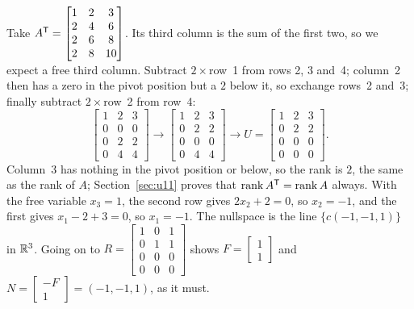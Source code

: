 \begin{example}\label{ex:u08-transpose}
Take $A^{\mathsf{T}}=\begin{bmatrix}1&2&3\\2&4&6\\2&6&8\\2&8&10\end{bmatrix}$. Its third column is the
sum of the first two, so we expect a free third column. Subtract $2\times$row~1 from rows 2, 3
and~4; column~2 then has a zero in the pivot position but a $2$ below it, so exchange rows~2
and~3; finally subtract $2\times$row~2 from row~4:
\[
\begin{bmatrix}1&2&3\\0&0&0\\0&2&2\\0&4&4\end{bmatrix}\longrightarrow
\begin{bmatrix}1&2&3\\0&2&2\\0&0&0\\0&4&4\end{bmatrix}\longrightarrow
U=\begin{bmatrix}1&2&3\\0&2&2\\0&0&0\\0&0&0\end{bmatrix}.
\]
Column~3 has nothing in the pivot position or below, so the rank is $2$, the same as the rank
of $A$; Section~\ref{sec:u11} proves that $\operatorname{rank} A^{\mathsf{T}}=\operatorname{rank} A$ always. With the free variable
$x_3=1$, the second row gives $2x_2+2=0$, so $x_2=-1$, and the first gives $x_1-2+3=0$, so
$x_1=-1$. The nullspace is the line $\{c(-1,-1,1)\}$ in $\mathbb{R}^3$. Going on to
$R=\begin{bmatrix}1&0&1\\0&1&1\\0&0&0\\0&0&0\end{bmatrix}$ shows $F=\begin{bmatrix}1\\1\end{bmatrix}$
and $N=\begin{bmatrix}-F\\1\end{bmatrix}=(-1,-1,1)$, as it must.
\end{example}

